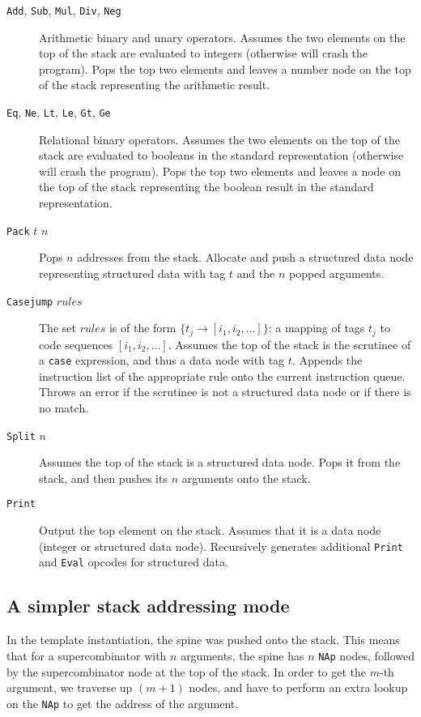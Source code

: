 \begin{description}
\item[\texttt{Add}, \texttt{Sub}, \texttt{Mul}, \texttt{Div}, \texttt{Neg}] Arithmetic binary and unary operators. Assumes the two elements on the top of the stack are evaluated to integers (otherwise will crash the program). Pops the top two elements and leaves a number node on the top of the stack representing the arithmetic result.
\item[\texttt{Eq}, \texttt{Ne}, \texttt{Lt}, \texttt{Le}, \texttt{Gt}, \texttt{Ge}] Relational binary operators. Assumes the two elements on the top of the stack are evaluated to booleans in the standard representation (otherwise will crash the program). Pops the top two elements and leaves a node on the top of the stack representing the boolean result in the standard representation.
\item[\texttt{Pack} $t$ $n$] Pops $n$ addresses from the stack. Allocate and push a structured data node representing structured data with tag $t$ and the $n$ popped arguments.
\item[\texttt{Casejump} $rules$] The set $rules$ is of the form $\{t_j\to [i_1,i_2,\dots]\}$: a mapping of tags $t_j$ to code sequences $[i_1,i_2,\dots]$. Assumes the top of the stack is the scrutinee of a \texttt{case} expression, and thus a data node with tag $t$. Appends the instruction list of the appropriate rule onto the current instruction queue. Throws an error if the scrutinee is not a structured data node or if there is no match.
\item[\texttt{Split} $n$] Assumes the top of the stack is a structured data node. Pops it from the stack, and then pushes its $n$ arguments onto the stack.
\item[\texttt{Print}] Output the top element on the stack. Assumes that it is a data node (integer or structured data node). Recursively generates additional \texttt{Print} and \texttt{Eval} opcodes for structured data.

\end{description}

\subsection{A simpler stack addressing mode}
\label{sec:gm-addressing-mode}

In the template instantiation, the spine was pushed onto the stack. This means that for a supercombinator with $n$ arguments, the spine has $n$ \texttt{NAp} nodes, followed by the supercombinator node at the top of the stack. In order to get the $m$-th argument, we traverse up $(m+1)$ nodes, and have to perform an extra lookup on the \texttt{NAp} to get the address of the argument.

